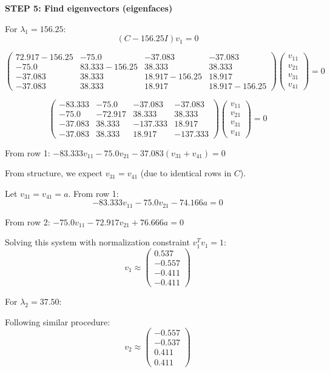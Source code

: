 \documentclass[12pt]{article}
\begin{document}
\begin{solution}
\textbf{STEP 5: Find eigenvectors (eigenfaces)}

For $\lambda_1 = 156.25$:
\[
(C - 156.25 I)v_1 = 0
\]

\[
\begin{pmatrix}
72.917 - 156.25 & -75.0 & -37.083 & -37.083 \\
-75.0 & 83.333 - 156.25 & 38.333 & 38.333 \\
-37.083 & 38.333 & 18.917 - 156.25 & 18.917 \\
-37.083 & 38.333 & 18.917 & 18.917 - 156.25
\end{pmatrix}
\begin{pmatrix}
v_{11} \\
v_{21} \\
v_{31} \\
v_{41}
\end{pmatrix} = 0
\]

\[
\begin{pmatrix}
-83.333 & -75.0 & -37.083 & -37.083 \\
-75.0 & -72.917 & 38.333 & 38.333 \\
-37.083 & 38.333 & -137.333 & 18.917 \\
-37.083 & 38.333 & 18.917 & -137.333
\end{pmatrix}
\begin{pmatrix}
v_{11} \\
v_{21} \\
v_{31} \\
v_{41}
\end{pmatrix} = 0
\]

From row 1: $-83.333v_{11} - 75.0v_{21} - 37.083(v_{31} + v_{41}) = 0$

From structure, we expect $v_{31} = v_{41}$ (due to identical rows in $C$).

Let $v_{31} = v_{41} = a$. From row 1:
\[
-83.333v_{11} - 75.0v_{21} - 74.166a = 0
\]

From row 2: $-75.0v_{11} - 72.917v_{21} + 76.666a = 0$

Solving this system with normalization constraint $v_1^Tv_1 = 1$:
\[
v_1 \approx \begin{pmatrix}
0.537 \\
-0.557 \\
-0.411 \\
-0.411
\end{pmatrix}
\]

For $\lambda_2 = 37.50$:

Following similar procedure:
\[
v_2 \approx \begin{pmatrix}
-0.557 \\
-0.537 \\
0.411 \\
0.411
\end{pmatrix}
\]


\end{solution}
\end{document}
